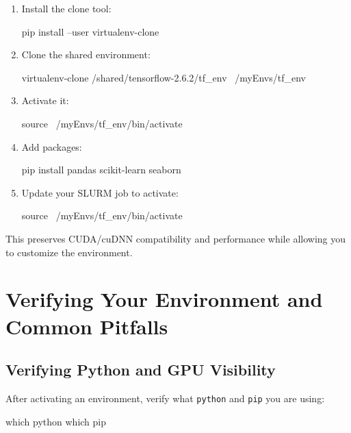 \documentclass[11pt]{article}
\begin{document}
\begin{enumerate}[label=Step \arabic*:, leftmargin=*]
  \item Install the clone tool:\\
  \begin{codeblock}
pip install --user virtualenv-clone
  \end{codeblock}

  \item Clone the shared environment:\\
  \begin{codeblock}
virtualenv-clone /shared/tensorflow-2.6.2/tf_env ~/myEnvs/tf_env
  \end{codeblock}

  \item Activate it:\\
  \begin{codeblock}
source ~/myEnvs/tf_env/bin/activate
  \end{codeblock}

  \item Add packages:\\
  \begin{codeblock}
pip install pandas scikit-learn seaborn
  \end{codeblock}

  \item Update your SLURM job to activate:\\
  \begin{codeblock}
source ~/myEnvs/tf_env/bin/activate
  \end{codeblock}
\end{enumerate}

This preserves CUDA/cuDNN compatibility and performance while allowing you to customize the environment.

\section{Verifying Your Environment and Common Pitfalls}
\label{sec:verify-common}

\subsection{Verifying Python and GPU Visibility}

After activating an environment, verify what \texttt{python} and \texttt{pip} you are using:\\
\begin{codeblock}
which python
which pip
\end{codeblock}
\end{document}
